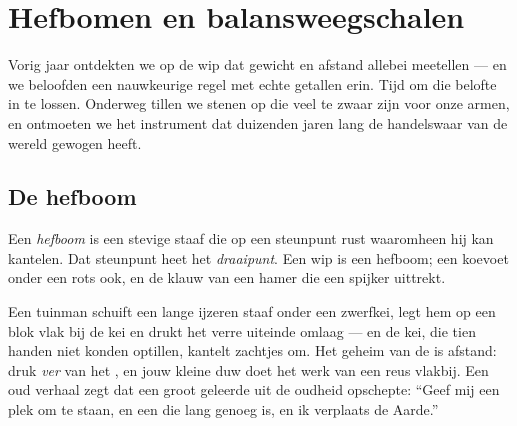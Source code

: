 \chapter{Hefbomen en balansweegschalen}\label{ch:g3:levers-and-scales}

Vorig jaar ontdekten we op de wip dat gewicht en afstand allebei
meetellen --- en we beloofden een nauwkeurige regel met echte getallen
erin. Tijd om die belofte in te lossen. Onderweg tillen we stenen op
die veel te zwaar zijn voor onze armen, en ontmoeten we het instrument
dat duizenden jaren lang de handelswaar van de wereld gewogen heeft.

\section{De hefboom}

\begin{definition}\label{def:g3:levers-and-scales:lever}
Een \emph{hefboom} is een stevige staaf die op een
steunpunt rust waaromheen hij kan kantelen. Dat steunpunt heet het
\emph{draaipunt}. Een wip is een hefboom; een koevoet
onder een rots ook, en de klauw van een hamer die een spijker
uittrekt.
\end{definition}

\begin{example}[De krachtvermenigvuldiger]\label{ex:g3:levers-and-scales:crowbar}
Een tuinman schuift een lange ijzeren staaf onder een zwerfkei, legt
hem op een blok vlak bij de kei en drukt het verre uiteinde omlaag ---
en de kei, die tien handen niet konden optillen, kantelt zachtjes om.
Het geheim van de  is afstand: druk \emph{ver} van het
, en jouw kleine duw doet het werk van een reus vlakbij.
Een oud verhaal zegt dat een groot geleerde uit de oudheid opschepte:
``Geef mij een plek om te staan, en een  die lang genoeg is,
en ik verplaats de Aarde.''
\end{example}

